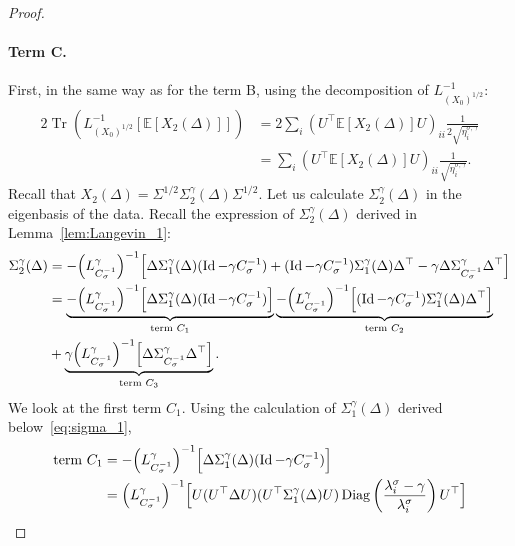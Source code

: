\documentclass[11pt]{article}
\newcommand{\tr}[1]{\operatorname{Tr}\left({#1}\right)}
\newcommand{\id}{\operatorname{Id}}
\newcommand{\EE}{\mathbb{E}}
\newcommand{\diag}[1]{\operatorname{Diag}\left({#1}\right)}
\begin{document}
\begin{proof}
\paragraph{Term C.} First, in the same way as for the term B, using the decomposition of $L_{(X_0)^{1/2}}^{-1}$:
\begin{align*}
    2 \tr{L_{(X_0)^{1/2}}^{-1}\left[\EE[X_2(\Delta)]\right]} &= 2 \sum_i \left( U^\top \EE \left[ X_2(\Delta) \right] U \right)_{ii} \frac{1}{2 \sqrt{\eta^{\sigma,\gamma}_i}} \\
    &= \sum_i \left( U^\top \EE \left[ X_2(\Delta) \right] U \right)_{ii} \frac{1}{\sqrt{\eta^{\sigma,\gamma}_i}} .
\end{align*}
Recall that $X_2(\Delta) = {\Sigma}^{1/2}\Sigma^\gamma_{2} (\Delta) {\Sigma}^{1/2}$. Let us calculate $\Sigma^\gamma_{2} (\Delta)$ in the eigenbasis of the data. Recall the expression of $\Sigma^\gamma_2(\Delta)$ derived in Lemma~\ref{lem:Langevin_1}:
\begin{align*}
\Sigma_2^\gamma(\Delta) &= -\Bigl(L^\gamma_{{C_\sigma^{-1}}}\Bigr)^{-1}\Bigl[
\Delta \Sigma^\gamma_{{1}}(\Delta) (\id - \gamma {{C_\sigma^{-1}}}) + (\id - \gamma {{C_\sigma^{-1}}})\Sigma^\gamma_{{1}}(\Delta) \Delta^\top- \gamma   \Delta  \Sigma^\gamma_{{{C_\sigma^{-1}}}}  \Delta^\top
\Bigr] \\
&= \underbrace{-\Bigl(L^\gamma_{{C_\sigma^{-1}}}\Bigr)^{-1}\Bigl[
\Delta \Sigma^\gamma_{{1}}(\Delta) (\id - \gamma {{C_\sigma^{-1}}}) \Bigr]}_{\text{term } C_1} \underbrace{-\Bigl(L^\gamma_{{C_\sigma^{-1}}}\Bigr)^{-1}\Bigl[ (\id - \gamma {{C_\sigma^{-1}}})\Sigma^\gamma_{{1}}(\Delta) \Delta^\top \Bigr]}_{\text{term } C_2} \\ & \nonumber +  \underbrace{\gamma \Bigl(L^\gamma_{{C_\sigma^{-1}}}\Bigr)^{-1}\Bigl[\Delta  \Sigma^\gamma_{{{C_\sigma^{-1}}}}  \Delta^\top
\Bigr]}_{\text{term } C_3}.
\end{align*}
We look at the first term $C_1$. Using the calculation of $\Sigma^\gamma_{{1}}(\Delta)$ derived below~\eqref{eq:sigma_1},
\begin{align*}
\text{term } C_1 &= -\Bigl(L^\gamma_{{C_\sigma^{-1}}}\Bigr)^{-1}\Bigl[ \Delta \Sigma_1^\gamma(\Delta)(\id - \gamma {{C_\sigma^{-1}}}) \Bigr] \\
&= \Bigl(L^\gamma_{{C_\sigma^{-1}}}\Bigr)^{-1}\Bigl[  U (U^\top \Delta U) (U^\top \Sigma_1^\gamma(\Delta) U)\diag{\frac{\lambda^\sigma_i - \gamma}{\lambda^\sigma_i }}
U^\top  \Bigr]
\\

\end{align*}
\end{proof}
\end{document}
